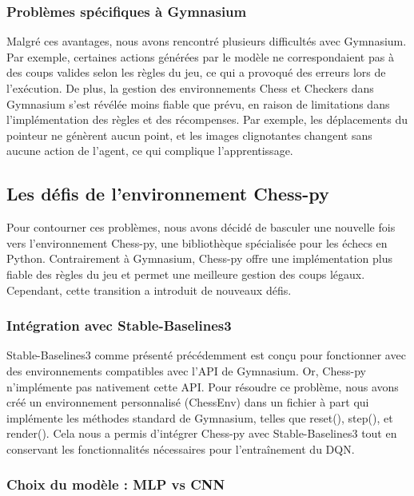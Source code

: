 \documentclass{article}
\begin{document}
    \subsubsection{Problèmes spécifiques à Gymnasium}

    \quad Malgré ces avantages, nous avons rencontré plusieurs difficultés avec Gymnasium. Par exemple, certaines actions générées par le modèle ne correspondaient pas à des coups valides selon les règles du jeu, ce qui a provoqué des erreurs lors de l'exécution. De plus, la gestion des environnements Chess et Checkers dans Gymnasium s'est révélée moins fiable que prévu, en raison de limitations dans l'implémentation des règles et des récompenses. Par exemple, les déplacements du pointeur ne génèrent aucun point, et les images clignotantes changent sans aucune action de l'agent, ce qui complique l'apprentissage.

\subsection{Les défis de l'environnement Chess-py}
\quad Pour contourner ces problèmes, nous avons décidé de basculer une nouvelle fois vers l'environnement Chess-py, une bibliothèque spécialisée pour les échecs en Python. Contrairement à Gymnasium, Chess-py offre une implémentation plus fiable des règles du jeu et permet une meilleure gestion des coups légaux. Cependant, cette transition a introduit de nouveaux défis.

    \subsubsection{Intégration avec Stable-Baselines3}

    \quad Stable-Baselines3 comme présenté précédemment est conçu pour fonctionner avec des environnements compatibles avec l'API de Gymnasium. Or, Chess-py n'implémente pas nativement cette API. Pour résoudre ce problème, nous avons créé un environnement personnalisé (ChessEnv) dans un fichier à part qui implémente les méthodes standard de Gymnasium, telles que reset(), step(), et render(). Cela nous a permis d'intégrer Chess-py avec Stable-Baselines3 tout en conservant les fonctionnalités nécessaires pour l'entraînement du DQN.

    \subsubsection{Choix du modèle : MLP vs CNN}
\end{document}
